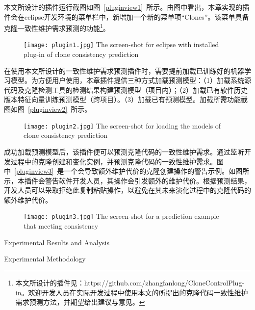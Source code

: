 本文所设计的插件运行截图如图~\ref{pluginview1}~所示。由图中看出，本章实现的插件会在eclipse开发环境的菜单栏中，新增加一个新的菜单项“Clones”。该菜单具备克隆一致性维护需求预测的功能\footnote{本文所设计的插件见：https://github.com/zhangfanlong/CloneControlPlug-in。欢迎开发人员在实际开发过程中使用本文的所提出的克隆代码一致性维护需求预测方法，并期望给出建议与意见。}。

\begin{figure}[htbp]
\centering
\texttt{[image: plugin1.jpg]}
{The screen-shot for eclipse with installed plug-in of clone consistency prediction}
\vspace{-1em}
\end{figure}

在使用本文所设计的一致性维护需求预测插件时，需要提前加载已训练好的机器学习模型。为方便用户使用，本章插件提供三种方式加载预测模型：（1）加载系统源代码及克隆检测工具的检测结果构建预测模型（项目内）；（2）加载已有软件历史版本特征向量训练预测模型（跨项目）。（3）加载已有预测模型。加载所需功能截图如图~\ref{pluginview2}~所示。

\begin{figure}[htbp]
\centering
\texttt{[image: plugin2.jpg]}
{The screen-shot for loading the models of clone consistency prediction}
\vspace{-1em}
\end{figure}

成功加载预测模型后，该插件便可以预测克隆代码的一致性维护需求。通过监听开发过程中的克隆创建和变化实例，并预测克隆代码的一致性维护需求。图中~\ref{pluginview3}~是一个会导致额外维护代价的克隆创建操作的警告示例。如图所示，本插件会警告软件开发人员，其操作会引发额外的维护代价。根据预测结果，开发人员可以采取拒绝此复制粘贴操作，以避免在其未来演化过程中的克隆代码的额外维护代价。

\begin{figure}[htbp]
\centering
\texttt{[image: plugin3.jpg]}
{The screen-shot for a prediction example that meeting consistency}
\vspace{-1em}
\end{figure}

{Experimental Results and Analysis}

{Experimental Methodology}


